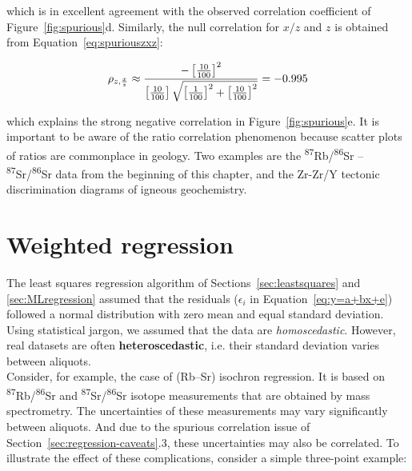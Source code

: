 \begin{enumerate}
\noindent which is in excellent agreement with the observed
correlation coefficient of Figure~\ref{fig:spurious}d. Similarly, the
null correlation for $x/z$ and $z$ is obtained from
Equation~\ref{eq:spuriouszxz}:

\begin{equation*}
  \noindent \rho_{z,\frac{x}{z}} \approx
  \frac{
    - \left[\frac{10}{100}\right]^2
  }{
    \left[\frac{10}{100}\right]
    \sqrt{\left[\frac{1}{100}\right]^2 +
      \left[\frac{10}{100}\right]^2
    }
  } = -0.995
\end{equation*}

\noindent which explains the strong negative correlation in
Figure~\ref{fig:spurious}e.  It is important to be aware of the ratio
correlation phenomenon because scatter plots of ratios are commonplace
in geology. Two examples are the
\textsuperscript{87}Rb/\textsuperscript{86}Sr --
\textsuperscript{87}Sr/\textsuperscript{86}Sr data from the beginning
of this chapter, and the Zr-Zr/Y tectonic discrimination diagrams of
igneous geochemistry.
 
\end{enumerate}

\section{Weighted regression}
\label{sec:weightedregression}

The least squares regression algorithm of
Sections~\ref{sec:leastsquares} and \ref{sec:MLregression} assumed
that the residuals ($\epsilon_i$ in Equation~\ref{eq:y=a+bx+e})
followed a normal distribution with zero mean and equal standard
deviation. Using statistical jargon, we assumed that the data are
\emph{homoscedastic}. However, real datasets are often
\textbf{heteroscedastic}, i.e. their standard deviation varies between
aliquots.\\

Consider, for example, the case of (Rb--Sr) isochron regression.  It
is based on \textsuperscript{87}Rb/\textsuperscript{86}Sr and
\textsuperscript{87}Sr/\textsuperscript{86}Sr isotope measurements
that are obtained by mass spectrometry. The uncertainties of these
measurements may vary significantly between aliquots. And due to the
spurious correlation issue of Section~\ref{sec:regression-caveats}.3,
these uncertainties may also be correlated. To illustrate the effect
of these complications, consider a simple three-point example:

